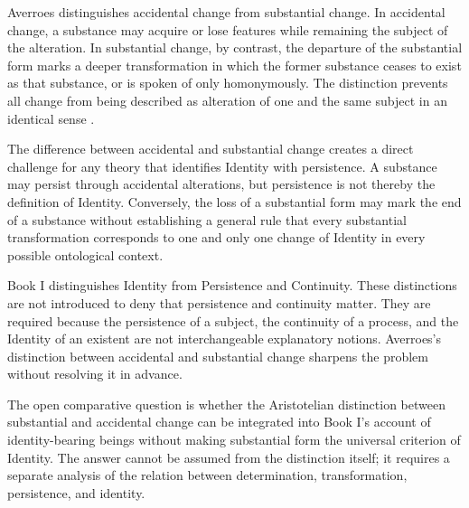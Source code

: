 \label{para:VS.B01.P01.C08.S15.SS13.P001}

Averroes distinguishes accidental change from
substantial change. In accidental change, a
substance may acquire or lose features while
remaining the subject of the alteration. In
substantial change, by contrast, the departure
of the substantial form marks a deeper
transformation in which the former substance
ceases to exist as that substance, or is
spoken of only homonymously. The distinction
prevents all change from being described
as alteration of one and the same subject
in an identical sense
\citep{AverroesEpitomeMetaphysicsArnzen2010,
BenAhmedPasnauIbnRushdSEP2025}.

\label{para:VS.B01.P01.C08.S15.SS13.P002}

The difference between accidental and substantial
change creates a direct challenge for any
theory that identifies Identity with persistence.
A substance may persist through accidental
alterations, but persistence is not thereby
the definition of Identity. Conversely, the
loss of a substantial form may mark the end
of a substance without establishing a general
rule that every substantial transformation
corresponds to one and only one change of
Identity in every possible ontological context.

\label{para:VS.B01.P01.C08.S15.SS13.P003}

Book I distinguishes Identity from Persistence
and Continuity. These distinctions are not
introduced to deny that persistence and
continuity matter. They are required because
the persistence of a subject, the continuity
of a process, and the Identity of an existent
are not interchangeable explanatory notions.
Averroes's distinction between accidental
and substantial change sharpens the problem
without resolving it in advance.

\label{para:VS.B01.P01.C08.S15.SS13.P004}

The open comparative question is whether
the Aristotelian distinction between substantial
and accidental change can be integrated into
Book I's account of identity-bearing beings
without making substantial form the universal
criterion of Identity. The answer cannot be
assumed from the distinction itself; it
requires a separate analysis of the relation
between determination, transformation,
persistence, and identity.



